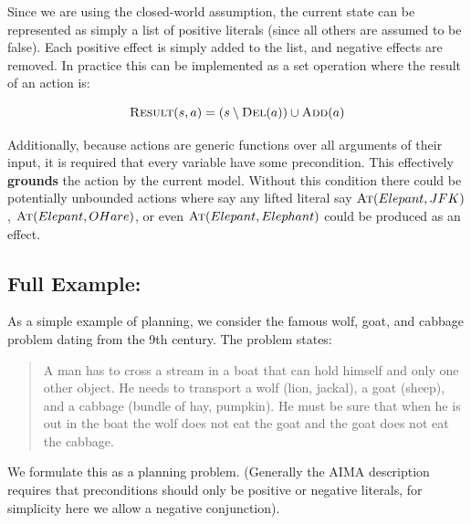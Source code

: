 \documentclass[11pt]{article}
\begin{document}
Since we are using the closed-world assumption, the current state can be represented as simply a list of positive literals (since all others are assumed to be false). Each positive effect is simply added to the list, and negative effects are removed. In practice this can be implemented as a set operation where the result of an action is: 

\[\mathrm{\textsc{Result}}(s, a) = (s \setminus \mathrm{\textsc{Del}}(a)) \cup \mathrm{\textsc{Add}}(a) \]  

Additionally, because actions are generic functions over all arguments of their input, it is required that every variable have some precondition. This effectively \textbf{grounds} the action by the current model. Without this condition there could be potentially unbounded actions where say any lifted literal say $\mathrm{\textsc{At}}(Elepant, JFK)$, $\mathrm{\textsc{At}}(Elepant, OHare)$, or even $\mathrm{\textsc{At}}(Elepant, Elephant)$ could be produced as an effect.   

\subsection{Full Example: }

As a simple example of planning, we consider the famous wolf, goat, and cabbage problem dating from the 9th century. The problem states:


\begin{quote}
  A man has to cross a stream in a boat that can hold himself and only
  one other object. He needs to transport a wolf (lion, jackal), a
  goat (sheep), and a cabbage (bundle of hay, pumpkin). He must be
  sure that when he is out in the boat the wolf does not eat the goat
  and the goat does not eat the cabbage.
\end{quote}

We formulate this as a planning problem. (Generally the AIMA description requires that preconditions should only be positive or negative literals, for simplicity here we allow a negative conjunction).
 
\end{document}
